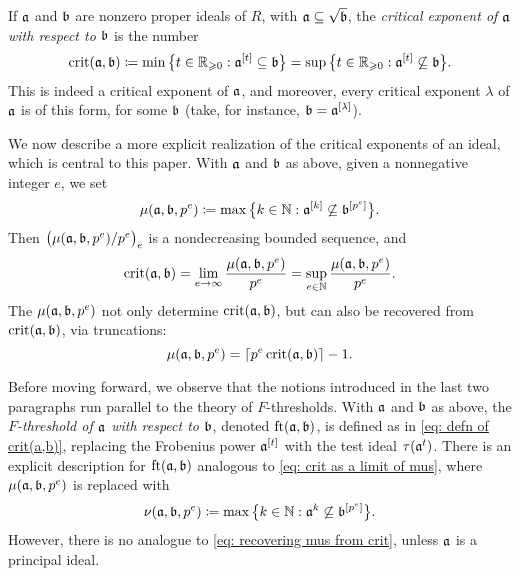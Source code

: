 \documentclass[11pt]{amsart}
\begin{document}
{If $\mathfrak{a}$ and $\mathfrak{b}$ are nonzero proper ideals of $R$, with $\mathfrak{a} \subseteq \sqrt{\mathfrak{b}}$, the \emph{critical exponent of $\mathfrak{a}$ with respect to $\mathfrak{b}$} is the number
\begin{equation}\label{eq: defn of crit(a,b)}
   \operatorname{crit}(\mathfrak{a},\mathfrak{b}) \coloneqq \min\big\{t\in \mathbb{R}_{\geqslant 0}: \mathfrak{a}^{[t]} \subseteq \mathfrak{b}\big\}
      = \sup\big\{t\in \mathbb{R}_{\geqslant 0}: \mathfrak{a}^{[t]} \not\subseteq \mathfrak{b}\big\}.
\end{equation}
This is indeed a critical exponent of $\mathfrak{a}$, and moreover, every critical exponent $\lambda$ of $\mathfrak{a}$ is of this form, for some $\mathfrak{b}$ (take, for instance, $\mathfrak{b} = \mathfrak{a}^{[\lambda]}$).

We now describe a more explicit realization of the critical exponents of an ideal, which is central to this paper.
With $\mathfrak{a}$ and $\mathfrak{b}$ as above, given a nonnegative integer $e$, we set
\[\mu(\mathfrak{a},\mathfrak{b},p^e) \coloneqq \max\big\{k\in \mathbb{N} : \mathfrak{a}^{[k]} \not\subseteq \mathfrak{b}^{[p^e]}\big\}.\]
Then $\big(\mu(\mathfrak{a},\mathfrak{b},p^e)/p^e\big)_e$ is a nondecreasing bounded sequence, and
\begin{equation}\label{eq: crit as a limit of mus}
   \operatorname{crit}(\mathfrak{a},\mathfrak{b}) = \lim_{e\to \infty} \frac{\mu(\mathfrak{a},\mathfrak{b},p^e)}{p^e} = \sup_{e\in \mathbb{N}} \frac{\mu(\mathfrak{a},\mathfrak{b},p^e)}{p^e}.
\end{equation}
The $\mu(\mathfrak{a},\mathfrak{b},p^e)$ not only determine $\operatorname{crit}(\mathfrak{a},\mathfrak{b})$, but can also be recovered from $\operatorname{crit}(\mathfrak{a},\mathfrak{b})$, via truncations:
\begin{equation}\label{eq: recovering mus from crit}
   \mu(\mathfrak{a},\mathfrak{b},p^e) = \left\lceil p^e\operatorname{crit}(\mathfrak{a},\mathfrak{b}) \right\rceil - 1.
\end{equation}

Before moving forward, we observe that the notions introduced in the last two paragraphs run parallel to the theory of $F$-thresholds.
With $\mathfrak{a}$ and $\mathfrak{b}$ as above, the \emph{$F$-threshold of $\mathfrak{a}$ with respect to $\mathfrak{b}$}, denoted $\operatorname{ft}(\mathfrak{a}, \mathfrak{b})$, is defined as in \eqref{eq: defn of crit(a,b)}, replacing the Frobenius power $\mathfrak{a}^{[t]}$ with the test ideal $\tau(\mathfrak{a}^t)$.
There is an explicit description for $\operatorname{ft}(\mathfrak{a}, \mathfrak{b})$ analogous to \eqref{eq: crit as a limit of mus}, where $\mu(\mathfrak{a},\mathfrak{b},p^e)$ is replaced with
\[\nu(\mathfrak{a},\mathfrak{b},p^e) \coloneqq \max\big\{k\in \mathbb{N} : \mathfrak{a}^{k} \not\subseteq \mathfrak{b}^{[p^e]}\big\}.\]
However, there is no analogue to \eqref{eq: recovering mus from crit}, unless $\mathfrak{a}$ is a principal ideal.


}
\end{document}
